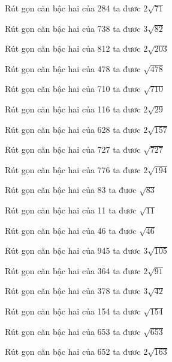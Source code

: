 \documentclass[12pt,a4paper]{article}
\begin{document}
\begin{ex}
Rút gọn căn bậc hai của 284 ta đươc $2\sqrt{71}$
\end{ex}
\begin{ex}
Rút gọn căn bậc hai của 738 ta đươc $3\sqrt{82}$
\end{ex}
\begin{ex}
Rút gọn căn bậc hai của 812 ta đươc $2\sqrt{203}$
\end{ex}
\begin{ex}
Rút gọn căn bậc hai của 478 ta đươc $\sqrt{478}$
\end{ex}
\begin{ex}
Rút gọn căn bậc hai của 710 ta đươc $\sqrt{710}$
\end{ex}
\begin{ex}
Rút gọn căn bậc hai của 116 ta đươc $2\sqrt{29}$
\end{ex}
\begin{ex}
Rút gọn căn bậc hai của 628 ta đươc $2\sqrt{157}$
\end{ex}
\begin{ex}
Rút gọn căn bậc hai của 727 ta đươc $\sqrt{727}$
\end{ex}
\begin{ex}
Rút gọn căn bậc hai của 776 ta đươc $2\sqrt{194}$
\end{ex}
\begin{ex}
Rút gọn căn bậc hai của 83 ta đươc $\sqrt{83}$
\end{ex}
\begin{ex}
Rút gọn căn bậc hai của 11 ta đươc $\sqrt{11}$
\end{ex}
\begin{ex}
Rút gọn căn bậc hai của 46 ta đươc $\sqrt{46}$
\end{ex}
\begin{ex}
Rút gọn căn bậc hai của 945 ta đươc $3\sqrt{105}$
\end{ex}
\begin{ex}
Rút gọn căn bậc hai của 364 ta đươc $2\sqrt{91}$
\end{ex}
\begin{ex}
Rút gọn căn bậc hai của 378 ta đươc $3\sqrt{42}$
\end{ex}
\begin{ex}
Rút gọn căn bậc hai của 154 ta đươc $\sqrt{154}$
\end{ex}
\begin{ex}
Rút gọn căn bậc hai của 653 ta đươc $\sqrt{653}$
\end{ex}
\begin{ex}
Rút gọn căn bậc hai của 652 ta đươc $2\sqrt{163}$
\end{ex}
\end{document}
